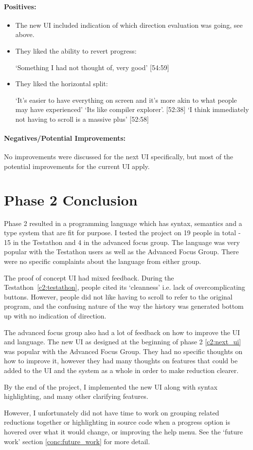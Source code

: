\paragraph{Positives:}
\begin{itemize}
    \item The new UI included indication of which direction evaluation was going, see above. 
    \item They liked the ability to revert progress: 
    
    `Something I had not thought of, very good' [54:59]
    \item They liked the horizontal split: 
    
    `It's easier to have everything on screen and it's more akin to what people may have experienced' `Its like compiler explorer'. [52:38] `I think immediately not having to scroll is a massive plus' [52:58]
\end{itemize}

\paragraph{Negatives/Potential Improvements:}
No improvements were discussed for the next UI specifically, but most of the potential improvements for the current UI apply. 

\section{Phase 2 Conclusion}
Phase 2 resulted in a programming language which has syntax, semantics and a type system that are fit for purpose. I tested the project on 19 people in total - 15 in the Testathon and 4 in the advanced focus group. The language was very popular with the Testathon users as well as the Advanced Focus Group. There were no specific complaints about the language from either group. 

The proof of concept UI had mixed feedback. During the Testathon~\ref{c2:testathon}, people cited its `cleanness' i.e. lack of overcomplicating buttons. However, people did not like having to scroll to refer to the original program, and the confusing nature of the way the history was generated bottom up with no indication of direction. 

The advanced focus group also had a lot of feedback on how to improve the UI and language. The new UI as designed at the beginning of phase 2 \ref{c2:next_ui} was popular with the Advanced Focus Group. They had no specific thoughts on how to improve it, however they had many thoughts on features that could be added to the UI and the system as a whole in order to make reduction clearer. 

By the end of the project, I implemented the new UI along with syntax highlighting, and many other clarifying features. 

However, I unfortunately did not have time to work on grouping related reductions together or highlighting in source code when a progress option is hovered over what it would change, or improving the help menu. See the `future work' section \ref{conc:future_work} for more detail. 
